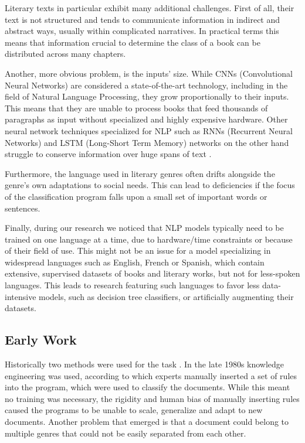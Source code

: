 \documentclass{article}
\begin{document}
	
	Literary texts in particular exhibit many additional challenges. First of all, their text is not structured and tends to communicate information in indirect and abstract ways, usually within complicated narratives. In practical terms this means that information crucial to determine the class of a book can be distributed across many chapters\cite{worsham}. \par 
	
	Another, more obvious problem, is the inputs' size. While CNNs (Convolutional Neural Networks) are considered a state-of-the-art technology, including in the field of Natural Language Processing, they grow proportionally to their inputs. This means that they are unable to process books that feed thousands of paragraphs as input without specialized and highly expensive hardware. Other neural network techniques specialized for NLP such as RNNs (Recurrent Neural Networks) and LSTM (Long-Short Term Memory) networks on the other hand struggle to conserve information over huge spans of text \cite{worsham_book}. \par
	
	Furthermore, the language used in literary genres often drifts alongside the genre's own adaptations to social needs. This can lead to deficiencies if the focus of the classification program falls upon a small set of important words or sentences\cite{brazil}. \par
	
	Finally, during our research we noticed that NLP models typically need to be trained on one language at a time, due to hardware/time constraints or because of their field of use. This might not be an issue for a model specializing in widespread languages such as English, French or Spanish, which contain extensive, supervised datasets of books and literary works, but not for less-spoken languages. This leads to research featuring such languages to favor less data-intensive models, such as decision tree classifiers\cite{brazil}, or artificially augmenting their datasets\cite{geroge}.\par
	
	\subsection{Early Work}
	
	Historically two methods were used for the task \cite{rami}. 
	In the late 1980s knowledge engineering was used, according to which experts manually inserted a set of rules into the program, which were used to classify the documents. While this meant no training was necessary, the rigidity and human bias of manually inserting rules caused the programs to be unable to scale, generalize and adapt to new documents. Another problem that emerged is that a document could belong to multiple genres that could not be easily separated from each other.\par
	
\end{document}
